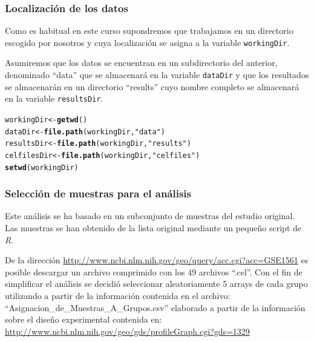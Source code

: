 \documentclass[a4paper]{article}\usepackage[]{graphicx}\usepackage[]{color}
\makeatletter
\newcommand{\hlstr}[1]{\textcolor[rgb]{0.192,0.494,0.8}{#1}}%
\newcommand{\hlstd}[1]{\textcolor[rgb]{0.345,0.345,0.345}{#1}}%
\newcommand{\hlkwb}[1]{\textcolor[rgb]{0.69,0.353,0.396}{#1}}%
\newcommand{\hlkwd}[1]{\textcolor[rgb]{0.737,0.353,0.396}{\textbf{#1}}}%
\newenvironment{kframe}{%
 \def\at@end@of@kframe{}%
 \ifinner\ifhmode%
  \def\at@end@of@kframe{\end{minipage}}%
  \begin{minipage}{\columnwidth}%
 \fi\fi%
 \def\FrameCommand##1{\hskip\@totalleftmargin \hskip-\fboxsep
 \colorbox{shadecolor}{##1}\hskip-\fboxsep
     \hskip-\linewidth \hskip-\@totalleftmargin \hskip\columnwidth}%
 \MakeFramed {\advance\hsize-\width
   \@totalleftmargin\z@ \linewidth\hsize
   \@setminipage}}%
 {\par\unskip\endMakeFramed%
 \at@end@of@kframe}
\newenvironment{knitrout}{}{} %
\newcommand{\R}{{\it R}}
\makeatother
\begin{document}
\subsubsection{Localización de los datos}

Como es habitual en este curso supondremos que trabajamos en un directorio 
escogido por nosotros y cuya localización se asigna a la variable \texttt{workingDir}.

Asumiremos que los datos se encuentran en un subdirectorio del anterior, denominado ``data'' que se almacenará en la variable \texttt{dataDir} y que los resultados se almacenarán en un directorio ``results'' cuyo nombre completo se almacenará en la variable  \texttt{resultsDir}.

\begin{knitrout}
\color{fgcolor}\begin{kframe}
\begin{alltt}
\hlstd{workingDir} \hlkwb{<-}\hlkwd{getwd}\hlstd{()}
\hlstd{dataDir} \hlkwb{<-}\hlkwd{file.path}\hlstd{(workingDir,} \hlstr{"data"}\hlstd{)}
\hlstd{resultsDir} \hlkwb{<-} \hlkwd{file.path}\hlstd{(workingDir,}\hlstr{"results"}\hlstd{)}
\hlstd{celfilesDir} \hlkwb{<-} \hlkwd{file.path}\hlstd{(workingDir,}\hlstr{"celfiles"}\hlstd{)}
\hlkwd{setwd}\hlstd{(workingDir)}
\end{alltt}
\end{kframe}
\end{knitrout}

\subsubsection{Selección de muestras para el análisis}

Este análisis se ha basado en un subconjunto de muestras del estudio original.
Las muestras se han obtenido de la lista original mediante un pequeño script de \R.

De la dirección  \url{http://www.ncbi.nlm.nih.gov/geo/query/acc.cgi?acc=GSE1561}  es posible descargar un archivo comprimido con los 49 archivos ``.cel''. Con el fin de simplificar el análisis se decidió seleccionar aleatoriamente 5 arrays de cada grupo utilizando a partir de la información contenida en el archivo: ``Asignacion_de_Muestras_A_Grupos.csv'' elaborado a partir de la información sobre el diseño experimental contenida en: \url{http://www.ncbi.nlm.nih.gov/geo/gds/profileGraph.cgi?gds=1329}
\end{document}
